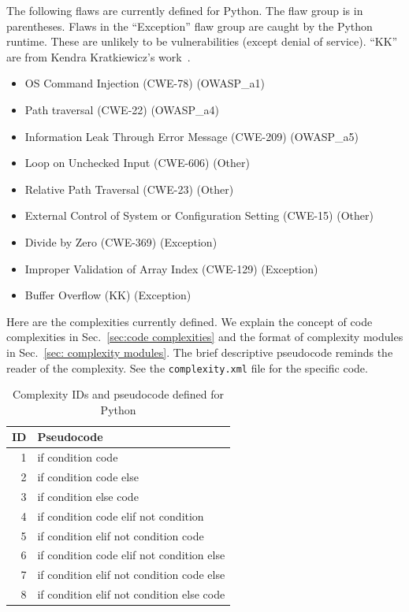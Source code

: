 \begin{appendices}
The following flaws are currently defined for Python.  The flaw group is in
parentheses.  Flaws in the ``Exception'' flaw group are caught by the Python runtime.
These are unlikely to be vulnerabilities (except denial of service).
``KK'' are from Kendra Kratkiewicz's work~\cite{Kratkiewicz2005}.
\begin{itemize}[nosep]
    \item OS Command Injection (CWE-78) (OWASP\_a1)
    \item Path traversal (CWE-22) (OWASP\_a4)
    \item Information Leak Through Error Message (CWE-209) (OWASP\_a5)
    \item Loop on Unchecked Input (CWE-606) (Other)
    \item Relative Path Traversal (CWE-23) (Other)
    \item External Control of System or Configuration Setting (CWE-15) (Other)
    \item Divide by Zero (CWE-369) (Exception)
    \item Improper Validation of Array Index (CWE-129) (Exception)
    \item Buffer Overflow (KK) (Exception)
\end{itemize}

\newpage

Here are the complexities currently defined.
We explain the concept of code complexities in Sec.~\ref{sec:code complexities} and
the format of complexity modules in Sec.~\ref{sec: complexity modules}.
The brief descriptive pseudocode reminds the reader of the complexity.
See the \verb|complexity.xml| file for the specific code.

\begin{table}[H]
\centering
\caption{Complexity IDs and pseudocode defined for Python}
\begin{tabular}{|r|l|}
\hline
\textbf{ID} & \textbf{Pseudocode} \\
\hline
 1 & if condition code \\
\hline
 2 & if condition code else \\
\hline
 3 & if condition else code \\
\hline
 4 & if condition code elif not condition \\
\hline
 5 & if condition elif not condition code \\
\hline
 6 & if condition code elif not condition else \\
\hline
 7 & if condition elif not condition code else \\
 \hline
 8 & if condition elif not condition else code \\
\hline


\end{tabular}
\end{table}
\end{appendices}

